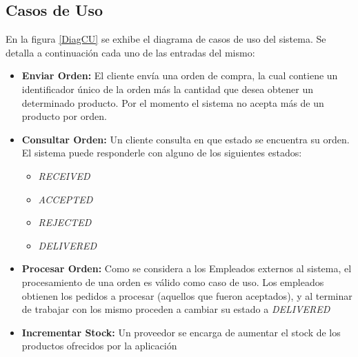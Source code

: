     \subsection{Casos de Uso}
        En la figura \ref{DiagCU} se exhibe el diagrama de casos de uso del 
        sistema. Se detalla a continuación cada uno de las entradas del mismo:
        \begin{itemize}
            \item \textbf{Enviar Orden:} El cliente envía una orden de compra,
            la cual contiene un identificador único de la orden más la cantidad
            que desea obtener un determinado producto. Por el momento el 
            sistema no acepta más de un producto por orden.
            \item \textbf{Consultar Orden:} Un cliente consulta en que 
            estado se encuentra su orden. El sistema puede responderle con 
            alguno de los siguientes estados: 
            \begin{itemize}
                \item \textit{RECEIVED}
                \item \textit{ACCEPTED}
                \item \textit{REJECTED}
                \item \textit{DELIVERED}
            \end{itemize}
            \item \textbf{Procesar Orden:} Como se considera a los Empleados
            externos al sistema, el procesamiento de una orden es válido como
            caso de uso. Los empleados obtienen los pedidos a procesar 
            (aquellos que fueron aceptados), y al terminar de trabajar con los
            mismo proceden a cambiar su estado a \textit{DELIVERED}
            \item \textbf{Incrementar Stock:} Un proveedor se encarga de 
            aumentar el stock de los productos ofrecidos por la aplicación
        \end{itemize}

